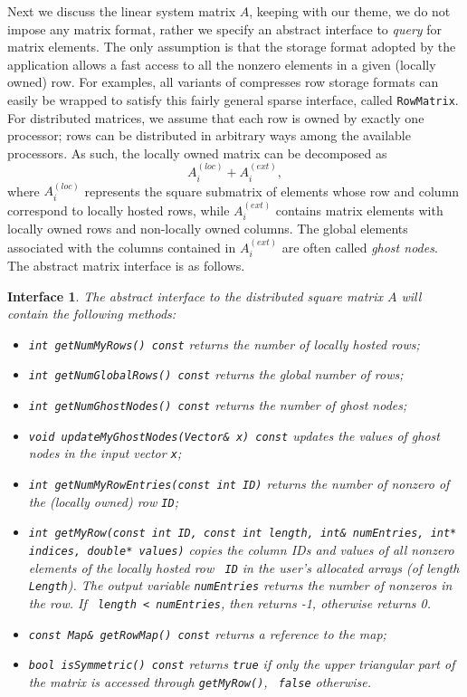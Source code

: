 \documentclass[acmtoms,acmnow]{acmtrans2m}
\newtheorem{interface}{Interface}[section]
\begin{document}
Next we discuss the linear system matrix $A$, keeping with our
theme, we do not impose any matrix format, rather we specify an
abstract interface to {\sl query} for matrix elements. The only
assumption is that the storage format adopted by the application
allows a fast access to all the nonzero elements in a given (locally
owned) row. For examples, all variants of compresses row storage
formats can easily be wrapped to satisfy this fairly general sparse
interface, called {\tt RowMatrix}. For distributed matrices, we
assume that each row is owned by exactly one processor; rows can be
distributed in arbitrary ways among the available processors. As
such, the locally owned matrix can be decomposed as
\begin{equation}
A^{(loc)}_i + A^{(ext)}_i,
\end{equation}
where $A^{(loc)}_i$ represents the square submatrix of elements
whose row and column correspond to locally hosted rows, while
$A^{(ext)}_i$ contains matrix elements with locally owned rows and
non-locally owned columns. The global elements associated with the
columns contained in $A_i^{(ext)}$ are often called {\sl ghost
nodes}. The abstract matrix interface is as follows.
\begin{interface}
\label{int:ami}
The abstract interface to the distributed square matrix $A$
will contain the following methods:
\begin{itemize}
\item \verb!int getNumMyRows() const! returns the number of locally hosted rows;
\item \verb!int getNumGlobalRows() const! returns the global number of rows;
\item \verb!int getNumGhostNodes() const! returns the number of ghost nodes;
\item \verb!void updateMyGhostNodes(Vector& x) const! updates the values of ghost nodes
 in the input vector {\tt x};
\item {\tt int getNumMyRowEntries(const int ID)} returns the number of nonzero of
the (locally owned) row {\tt ID};
\item {\tt int getMyRow(const int ID, const int length, int\& numEntries, int* indices, double*
                             values)} copies the
column IDs and values of all nonzero elements of the locally hosted row {\tt
  ID} in the user's allocated arrays (of length {\tt Length}). The output
  variable {\tt numEntries} returns the number of nonzeros in the row. If {\tt
    length < numEntries}, then returns -1, otherwise returns 0.
\item \verb!const Map& getRowMap() const! returns a reference to the map;
\item \verb!bool isSymmetric() const! returns {\tt true} if only the upper
triangular part of the matrix is accessed through {\tt getMyRow()},
{\tt
  false} otherwise.
\end{itemize}
\end{interface}
\end{document}
